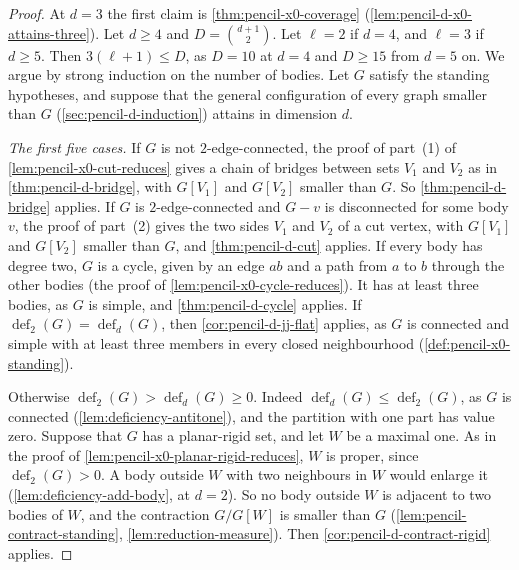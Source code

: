 \begin{proof}
  \leanok
  At $d = 3$ the first claim is \cref{thm:pencil-x0-coverage}
  (\cref{lem:pencil-d-x0-attains-three}). Let $d \ge 4$ and
  $D = \binom{d+1}{2}$. Let $\ell = 2$ if $d = 4$, and $\ell = 3$ if
  $d \ge 5$. Then $3(\ell + 1) \le D$, as $D = 10$ at $d = 4$ and
  $D \ge 15$ from $d = 5$ on. We argue by strong induction on the number
  of bodies. Let $G$ satisfy the standing hypotheses, and suppose that
  the general configuration of every graph smaller than $G$
  (\cref{sec:pencil-d-induction}) attains in dimension $d$.

  \emph{The first five cases.} If $G$ is not $2$-edge-connected, the
  proof of part~(1) of \cref{lem:pencil-x0-cut-reduces} gives a chain of
  bridges between sets $V_1$ and $V_2$ as in \cref{thm:pencil-d-bridge},
  with $G[V_1]$ and $G[V_2]$ smaller than $G$. So
  \cref{thm:pencil-d-bridge} applies. If $G$ is $2$-edge-connected and
  $G - v$ is disconnected for some body $v$, the proof of part~(2) gives
  the two sides $V_1$ and $V_2$ of a cut vertex, with $G[V_1]$ and
  $G[V_2]$ smaller than $G$, and \cref{thm:pencil-d-cut} applies. If
  every body has degree two, $G$ is a cycle, given by an edge $ab$ and a
  path from $a$ to $b$ through the other bodies (the proof of
  \cref{lem:pencil-x0-cycle-reduces}). It has at least three bodies, as
  $G$ is simple, and \cref{thm:pencil-d-cycle} applies. If
  $\operatorname{def}_2(G) = \operatorname{def}_d(G)$, then
  \cref{cor:pencil-d-jj-flat} applies, as $G$ is connected and simple
  with at least three members in every closed neighbourhood
  (\cref{def:pencil-x0-standing}).

  Otherwise $\operatorname{def}_2(G) > \operatorname{def}_d(G) \ge 0$.
  Indeed $\operatorname{def}_d(G) \le \operatorname{def}_2(G)$, as $G$
  is connected (\cref{lem:deficiency-antitone}), and the partition with
  one part has value zero. Suppose that $G$ has a planar-rigid set, and
  let $W$ be a maximal one. As in the proof of
  \cref{lem:pencil-x0-planar-rigid-reduces}, $W$ is proper, since
  $\operatorname{def}_2(G) > 0$. A body outside $W$ with two neighbours
  in $W$ would enlarge it (\cref{lem:deficiency-add-body}, at $d = 2$).
  So no body outside $W$ is adjacent to two bodies of $W$, and the
  contraction $G/G[W]$ is smaller than $G$
  (\cref{lem:pencil-contract-standing}, \cref{lem:reduction-measure}).
  Then \cref{cor:pencil-d-contract-rigid} applies.


\end{proof}
